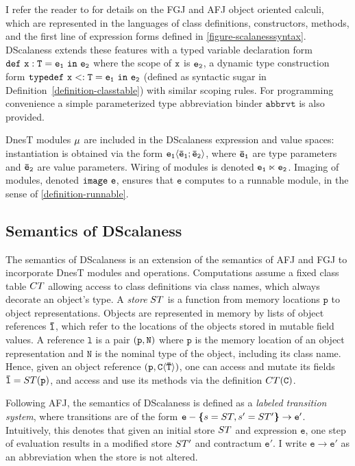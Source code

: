 I refer the reader to \cite{FJ,AFJ} for details on the FGJ and AFJ object oriented calculi,
which are represented in the languages of class definitions, constructors, methods, and the
first line of expression forms defined in \autoref{figure-scalanesssyntax}. DScalaness extends
these features with a typed variable declaration form $\jdef{x}{T}{e_1}{e_2}$ where the scope of
$\tt{x}$ is $\tt{e_2}$, a dynamic type construction form $\jtlet{x}{T}{e_1}{e_2}$ (defined as
syntactic sugar in Definition~\autoref{definition-classtable}) with similar scoping rules. For
programming convenience a simple parameterized type abbreviation binder $\texttt{abbrvt}$ is
also provided.

DnesT modules $\jmodval$ are included in the DScalaness expression and value spaces:
instantiation is obtained via the form $\jinst{e_1}{\ttvec{e}_1; \ttvec{e}_2}$, where
$\ttvec{e}_\texttt{1}$ are type parameters and $\ttvec{e}_\texttt{2}$ are value parameters.
Wiring of modules is denoted $\jwire{\tt{e_1}}{\tt{e_2}}$. Imaging of modules, denoted
$\jimage{\texttt{e}}$, ensures that $\texttt{e}$ computes to a runnable module, in the sense of
\autoref{definition-runnable}.

\subsection{Semantics of DScalaness}

The semantics of DScalaness is an extension of the semantics of AFJ and FGJ to incorporate DnesT
modules and operations. Computations assume a fixed class table $\CT$ allowing access to class
definitions via class names, which always decorate an object's type. A \emph{store} $\jstore$ is
a function from memory locations $\texttt{p}$ to object representations. Objects are represented
in memory by lists of object references $\ttvec{l}$, which refer to the locations of the objects
stored in mutable field values. A reference $\texttt{l}$ is a pair $\jref{\texttt{p}}{N}$ where
$\texttt{p}$ is the memory location of an object representation and $\texttt{N}$ is the nominal
type of the object, including its class name. Hence, given an object reference
$\jref{\texttt{p}}{\jinst{C}{\ttvec{T}}}$, one can access and mutate its fields $\ttvec{l} =
\jstore(\texttt{p})$, and access and use its methods via the definition $\CT(\texttt{C})$.

Following AFJ, the semantics of DScalaness is defined as a \emph{labeled transition system},
where transitions are of the form $\texttt{e} - \lc s = \jstore, s' = \jstore' \rc \rightarrow
\texttt{e}' $. Intuitively, this denotes that given an initial store $\jstore$ and expression
$\texttt{e}$, one step of evaluation results in a modified store $\jstore'$ and contractum
$\texttt{e}'$. I write $\texttt{e} \rightarrow \texttt{e}'$ as an abbreviation when the store
is not altered.

